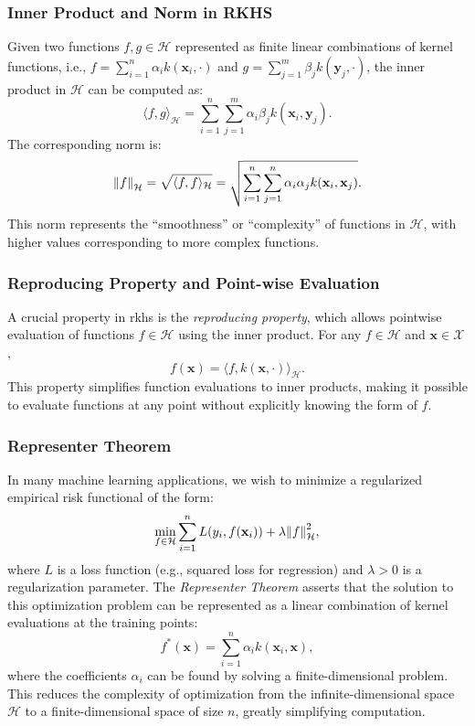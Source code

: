 \subsubsection{Inner Product and Norm in RKHS}

Given two functions $f, g \in \mathcal{H}$ represented as finite linear combinations of kernel functions, i.e., $f = \sum_{i=1}^n \alpha_i k(\mathbf{x}_i, \cdot)$ and $g = \sum_{j=1}^m \beta_j k(\mathbf{y}_j, \cdot)$, the inner product in $\mathcal{H}$ can be computed as:
\[
\langle f, g \rangle_{\mathcal{H}} = \sum_{i=1}^n \sum_{j=1}^m \alpha_i \beta_j k(\mathbf{x}_i, \mathbf{y}_j).
\]
The corresponding norm is:
\[
\norm{f}_{\mathcal{H}} = \sqrt{\langle f, f \rangle_{\mathcal{H}}} = \sqrt{\sum_{i=1}^n \sum_{j=1}^n \alpha_i \alpha_j k(\mathbf{x}_i, \mathbf{x}_j)}.
\]
This norm represents the ``smoothness'' or ``complexity'' of functions in $\mathcal{H}$, with higher values corresponding to more complex functions.

\subsubsection{Reproducing Property and Point-wise Evaluation}

A crucial property in \ac{rkhs} is the \textit{reproducing property}, which allows pointwise evaluation of functions $f \in \mathcal{H}$ using the inner product. For any $f \in \mathcal{H}$ and $\mathbf{x} \in \mathcal{X}$,
\[
f(\mathbf{x}) = \langle f, k(\mathbf{x}, \cdot) \rangle_{\mathcal{H}}.
\]
This property simplifies function evaluations to inner products, making it possible to evaluate functions at any point without explicitly knowing the form of $f$.

\subsubsection{Representer Theorem}

In many machine learning applications, we wish to minimize a regularized empirical risk functional of the form:
\[
\min_{f \in \mathcal{H}} \sum_{i=1}^n L(y_i, f(\mathbf{x}_i)) + \lambda \norm{f}_{\mathcal{H}}^2,
\]
where $L$ is a loss function (e.g., squared loss for regression) and $\lambda > 0$ is a regularization parameter. The \textit{Representer Theorem} asserts that the solution to this optimization problem can be represented as a linear combination of kernel evaluations at the training points:
\[
f^*(\mathbf{x}) = \sum_{i=1}^n \alpha_i k(\mathbf{x}_i, \mathbf{x}),
\]
where the coefficients $\alpha_i$ can be found by solving a finite-dimensional problem. This reduces the complexity of optimization from the infinite-dimensional space $\mathcal{H}$ to a finite-dimensional space of size $n$, greatly simplifying computation.

